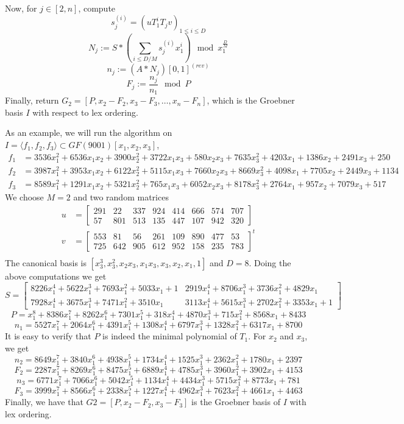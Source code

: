 \documentclass[12pt]{article}
\begin{document}
Now, for $j \in [2,n]$, compute 
$$s_j^{(i)} = (uT_1^i T_j v)_{1\le i \le D}$$
$$N_j := S*(\sum_{i\le D/M} s_j^{(i)} x_1^i) \mod x_1^{\frac{D}{M}}$$
$$n_j := (A*N_j)[0,1]^{(rev)}$$
$$F_j := \frac{n_j}{n_1} \mod P$$
Finally, return $G_2 = [P, x_2 - F_2, x_3 - F_3, \dots, x_n - F_n]$, which is the Groebner basis
$I$ with respect to lex ordering.

As an example, we will run the algorithm on $I = \langle f_1, f_2, f_3 \rangle \subset GF(9001)[x_1,x_2,x_3]$,
\begin{align*}
f_1 &= 3536x_1^2 +6536x_1x_2 + 3900x_2^2 + 3722x_1x_3 + 580x_2x_3 + 7635x_3^2 + 4203x_1 + 1386x_2 + 2491x_3 + 250\\
f_2 &= 3987x_1^2 + 3953x_1x_2 +6122x_2^2 +5115x_1x_3 +7660x_2x_3 +8669x_3^2 + 4098x_1 +7705x_2 + 2449x_3 + 1134\\
f_3 &= 8589x_1^2 + 1291x_1x_2 +5321x_2^2 + 765x_1x_3 +6052x_2x_3 +8178x_3^2 + 2764x_1 + 957x_2 +7079x_3 + 517
\end{align*}
We choose $M = 2$ and two random matrices
\begin{align*}
u &= \begin{bmatrix}
291&  22& 337& 924& 414& 666& 574& 707\\
57& 801& 513& 135& 447& 107& 942& 320
\end{bmatrix}\\
v &= \begin{bmatrix}
553&  81&  56& 261& 109& 890& 477&  53\\
725& 642& 905& 612& 952& 158& 235& 783
\end{bmatrix} ^ {t}\\
\end{align*}
The canonical basis is $[x_3^3, x_3^2, x_2x_3, x_1x_3, x_3, x_2, x_1, 1]$ and $D = 8$. Doing the above computations we get
$$S= \begin{bmatrix}
8226x_1^4 + 5622x_1^3 + 7693x_1^2 + 5033x_1 + 1&     2919x_1^4 + 8706x_1^3 + 3736x_1^2 + 4829x_1\\
7928x_1^4 + 3675x_1^3 + 7471x_1^2 + 3510x_1& 3113x_1^4 + 5615x_1^3 + 2702x_1^2 + 3353x_1 + 1
\end{bmatrix}$$
$$P =x_1^8 + 8386x_1^7 + 8262x_1^6 + 7301x_1^5 + 318x_1^4 + 4870x_1^3 + 715x_1^2 + 8568x_1 + 8433$$
$$n_1 = 5527x_1^7 + 2064x_1^6 + 4391x_1^5 + 1308x_1^4 + 6797x_1^3 + 1328x_1^2 + 6317x_1 + 8700$$
It is easy to verify that $P$ is indeed the minimal polynomial of $T_1$.
For $x_2$ and $x_3$, we get
$$n_2 = 8649x_1^7 + 3840x_1^6 + 4938x_1^5 + 1734x_1^4 + 1525x_1^3 + 2362x_1^2 + 1780x_1 + 2397$$
$$F_2 = 2287x_1^7 + 8269x_1^6 + 8475x_1^5 + 6889x_1^4 + 4785x_1^3 + 3960x_1^2 + 3902x_1 + 4153$$
$$n_3 = 6771x_1^7 + 7066x_1^6 + 5042x_1^5 + 1134x_1^4 + 4434x_1^3 + 5715x_1^2 + 8773x_1 + 781$$
$$F_3 = 3999x_1^7 + 8566x_1^6 + 2338x_1^5 + 1227x_1^4 + 4962x_1^3 + 7623x_1^2 + 4661x_1 + 4463$$
Finally, we have that $G2 = [P, x_2-F_2, x_3-F_3]$ is the Groebner basis of $I$ with lex ordering.
\end{document}
